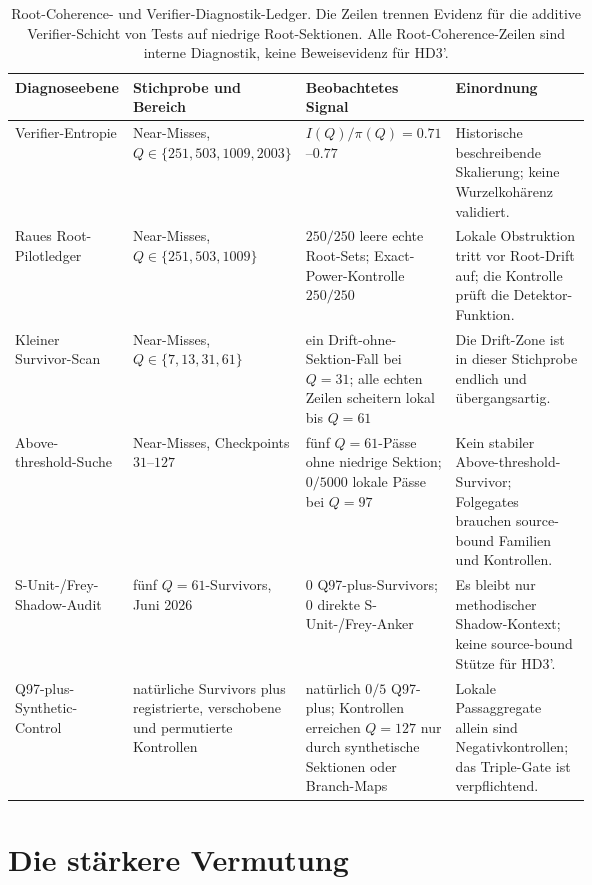 \documentclass[11pt,a4paper]{article}
\begin{document}
\begin{table}[htb]
\centering
\small
\begin{tabularx}{\textwidth}{@{} >{\raggedright\arraybackslash}p{0.20\linewidth} >{\raggedright\arraybackslash}p{0.25\linewidth} >{\raggedright\arraybackslash}p{0.22\linewidth} >{\raggedright\arraybackslash}X @{}}
\toprule
Diagnoseebene & Stichprobe und Bereich & Beobachtetes Signal & Einordnung \\
\midrule
Verifier-Entropie & 1000 Near-Misses, $Q\in\{251,503,1009,2003\}$ &
$I(Q)/\pi(Q)=0.71$--$0.77$ &
Historische beschreibende Skalierung; keine Wurzelkohärenz validiert. \\
\addlinespace
Raues Root-Pilotledger & 250 Near-Misses, $Q\in\{251,503,1009\}$ &
$250/250$ leere echte Root-Sets; Exact-Power-Kontrolle $250/250$ &
Lokale Obstruktion tritt vor Root-Drift auf; die Kontrolle prüft die Detektor-Funktion. \\
\addlinespace
Kleiner Survivor-Scan & 250 Near-Misses, $Q\in\{7,13,31,61\}$ &
ein Drift-ohne-Sektion-Fall bei $Q=31$; alle echten Zeilen scheitern lokal bis $Q=61$ &
Die Drift-Zone ist in dieser Stichprobe endlich und übergangsartig. \\
\addlinespace
Above-threshold-Suche & 5000 Near-Misses, Checkpoints $31$--$127$ &
fünf $Q=61$-Pässe ohne niedrige Sektion; $0/5000$ lokale Pässe bei $Q=97$ &
Kein stabiler Above-threshold-Survivor; Folgegates brauchen source-bound Familien und Kontrollen. \\
\addlinespace
S-Unit-/Frey-Shadow-Audit & fünf $Q=61$-Survivors, Juni 2026 &
$0$ Q97-plus-Survivors; $0$ direkte S-Unit-/Frey-Anker &
Es bleibt nur methodischer Shadow-Kontext; keine source-bound Stütze für HD3'. \\
\addlinespace
Q97-plus-Synthetic-Control & natürliche Survivors plus registrierte, verschobene und permutierte Kontrollen &
natürlich $0/5$ Q97-plus; Kontrollen erreichen $Q=127$ nur durch synthetische Sektionen oder Branch-Maps &
Lokale Passaggregate allein sind Negativkontrollen; das Triple-Gate ist verpflichtend. \\
\bottomrule
\end{tabularx}
\caption{Root-Coherence- und Verifier-Diagnostik-Ledger. Die Zeilen
trennen Evidenz für die additive Verifier-Schicht von Tests auf niedrige
Root-Sektionen. Alle Root-Coherence-Zeilen sind interne Diagnostik, keine
Beweisevidenz für HD3'.}
\label{tab:root-diagnostics}
\end{table}

\section{Die stärkere Vermutung}
\end{document}
